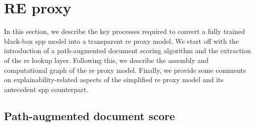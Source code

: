 \section{RE proxy}

In this section, we describe the key processes required to convert a fully
trained black-box \ac{spp} model into a transparent \ac{re} proxy model. We start
off with the introduction of a path-augmented document scoring algorithm and the
extraction of the \ac{re} lookup layer. Following this, we describe the assembly
and computational graph of the \ac{re} proxy model. Finally, we provide some
comments on explainability-related aspects of the simplified \ac{re} proxy model
and its antecedent \ac{spp} counterpart.

\subsection{Path-augmented document score}

